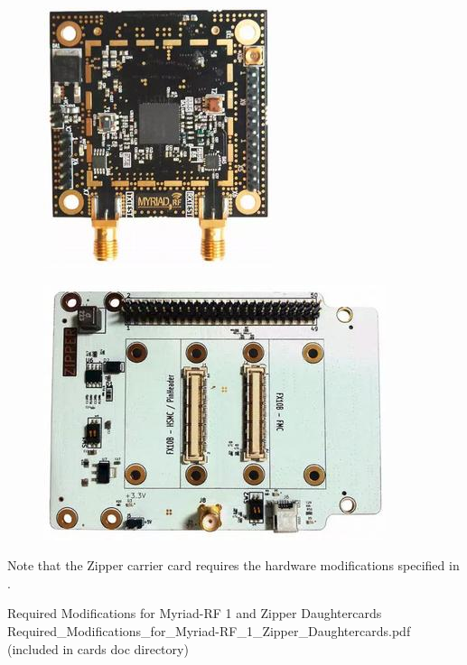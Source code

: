 \documentclass{article}
\begin{document}
	\begin{figure}[ht]
	\centering
		\begin{minipage}{.5\textwidth}
			\centering\includegraphics[width=0.65\linewidth]{myriadrf}
			\label{fig:myriadrf}
		\end{minipage}%
		\begin{minipage}{.5\textwidth}
			\centering\includegraphics[width=1.0\linewidth]{zipper}
			\label{fig:zipper}
		\end{minipage}
	\end{figure}
\noindent Note that the Zipper carrier card requires the hardware modifications specified in \cite{zipper_mods}.

\pagebreak
  \begin{thebibliography}{1}

   Required Modifications for Myriad-RF 1 and Zipper Daughtercards\\
	 Required\_Modifications\_for\_Myriad-RF\_1\_Zipper\_Daughtercards.pdf (included in cards doc directory)

  \end{thebibliography}
\end{document}
